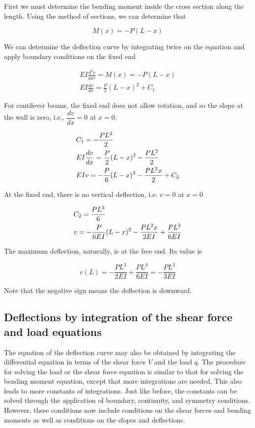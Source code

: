 \documentclass[
10pt,
a4paper,
openany,
svgnames,
]{kaobook} %
\begin{document}
\begin{solution}
First we must determine the bending moment inside the cross section along the length. Using the method of sections, we can determine that

\[M(x) =  - P(L - x)\]	

We can determine the deflection curve by integrating twice on the equation and apply boundary conditions on the fixed end

\begin{gather*}
  EI\frac{d^2v}{dx^2} = M(x) =  - P(L - x) \\
  EI\frac{dv}{dx} = \frac{P}{2}(L - x)^2 + C_1
\end{gather*}

For cantilever beams, the fixed end does not allow rotation, and so the slope at the wall is zero, i.e., $\dfrac{dv}{dx} = 0$ at $x = 0$.

\begin{gather*}
  C_1 =  - \frac{PL^2}{2} \hfill \\
  EI\frac{dv}{dx} = \frac{P}{2}(L - x)^2 - \frac{PL^2}{2} \hfill \\
  EIv =  - \frac{P}{6}{(L - x)^3} - \frac{PL^2x}{2} + C_2 \hfill
\end{gather*}

At the fixed end, there is no vertical deflection, i.e. $v = 0$ at $x = 0$

\begin{gather*}
  C_2 = \frac{PL^3}{6} \hfill \\
  v =  - \frac{P}{6EI}(L - x)^3 - \frac{PL^2x}{2EI} + \frac{PL^3}{6EI} \hfill \\ 
\end{gather*}

The maximum deflection, naturally, is at the free end. Its value is

\[v(L) =  - \frac{PL^3}{2EI} + \frac{PL^3}{6EI} =  - \frac{PL^3}{3EI}\]

Note that the negative sign means the deflection is downward.
\end{solution}

\subsection{Deflections by integration of the shear force and load equations}

The equation of the deflection curve may also be obtained by integrating the differential equation in terms of the shear force $V$ and the load $q$. The procedure for solving the load or the shear force equation is similar to that for solving the bending moment equation, except that more integrations are needed. This also leads to more constants of integrations. Just like before, the constants can be solved through the application of boundary, continuity, and symmetry conditions. However, these conditions now include conditions on the shear forces and bending moments as well as conditions on the slopes and deflections.
\end{document}
